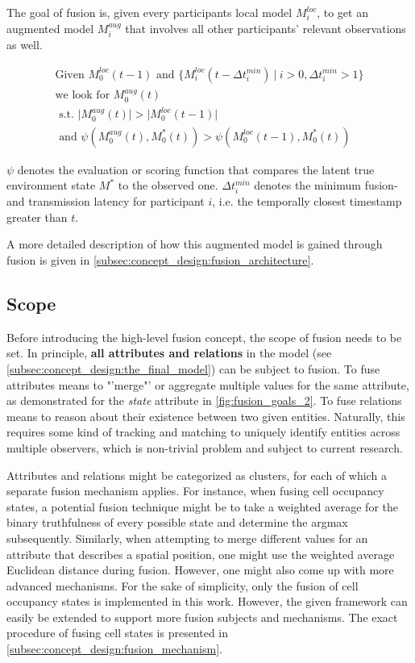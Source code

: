 The goal of fusion is, given every participants local model $M^{loc}_i$, to get an augmented model $M^{aug}_i$ that involves all other participants' relevant observations as well.

\begin{gather*}
	\text{Given\ } M^{loc}_0(t-1) \text{\ and\ } \{M^{loc}_i(t - \Delta t^{min}_i)\ |\ i > 0, \Delta t^{min}_i > 1\} \\
	\text{we look for\ } M^{aug}_0(t) \\ 
	\text{\ s.t.\ } \bigl|  M^{aug}_0(t) \bigl| > \bigl| M^{loc}_0(t-1) \bigl| \\
	\text{\ and\ } \psi(M^{aug}_0(t), M^{*}_0(t)) > \psi(M^{loc}_0(t-1), M^{*}_0(t))
\end{gather*}

$\psi$ denotes the evaluation or scoring function that compares the latent true environment state $M^*$ to the observed one. $\Delta t^{min}_i$ denotes the minimum fusion- and transmission latency for participant $i$, i.e. the temporally closest timestamp greater than $t$. 

A more detailed description of how this augmented model is gained through fusion is given in \autoref{subsec:concept_design:fusion_architecture}.

\subsection{Scope}
\label{subsec:concept_design:scope}
Before introducing the high-level fusion concept, the scope of fusion needs to be set. In principle, \textbf{all attributes and relations} in the model (see \autoref{subsec:concept_design:the_final_model}) can be subject to fusion. To fuse attributes means to "'merge"' or aggregate multiple values for the same attribute, as demonstrated for the \textit{state} attribute in \autoref{fig:fusion_goals_2}. To fuse relations means to reason about their existence between two given entities. Naturally, this requires some kind of tracking and matching to uniquely identify entities across multiple observers, which is non-trivial problem and subject to current research.

Attributes and relations might be categorized as clusters, for each of which a separate fusion mechanism applies. For instance, when fusing cell occupancy states, a potential fusion technique might be to take a weighted average for the binary truthfulness of every possible state and determine the argmax subsequently. Similarly, when attempting to merge different values for an attribute that describes a spatial position, one might use the weighted average Euclidean distance during fusion. However, one might also come up with more advanced mechanisms. For the sake of simplicity, only the fusion of cell occupancy states is implemented in this work. However, the given framework can easily be extended to support more fusion subjects and mechanisms. The exact procedure of fusing cell states is presented in \autoref{subsec:concept_design:fusion_mechanism}.


